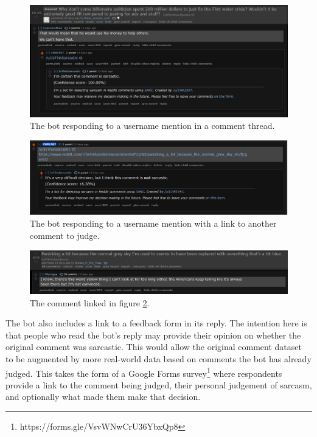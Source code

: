 \documentclass[a4paper,12pt]{article}
\begin{document}
\begin{figure}[H]
\includegraphics[width=\linewidth]{Figures/usage_example1.png}
\caption{The bot responding to a username mention in a comment thread.}
\label{fig:cmd2}
\end{figure}

\begin{figure}[H]
\includegraphics[width=\linewidth]{Figures/usage_example2.png}
\caption{The bot responding to a username mention with a link to another comment to judge.}
\label{fig:cmd3}
\end{figure}

\begin{figure}[H]
\includegraphics[width=\linewidth]{Figures/usage_example2_2.png}
\caption{The comment linked in figure \ref{fig:cmd3}.}
\label{fig:cmd4}
\end{figure}

The bot also includes a link to a feedback form in its reply. The intention here is that people who read the bot's reply may provide their opinion on whether the original comment was sarcastic. This would allow the original comment dataset to be augmented by more real-world data based on comments the bot has already judged. This takes the form of a Google Forms survey\footnote{https://forms.gle/VsvWNwCrU36YbxQp8} where respondents provide a link to the comment being judged, their personal judgement of sarcasm, and optionally what made them make that decision.
\end{document}
